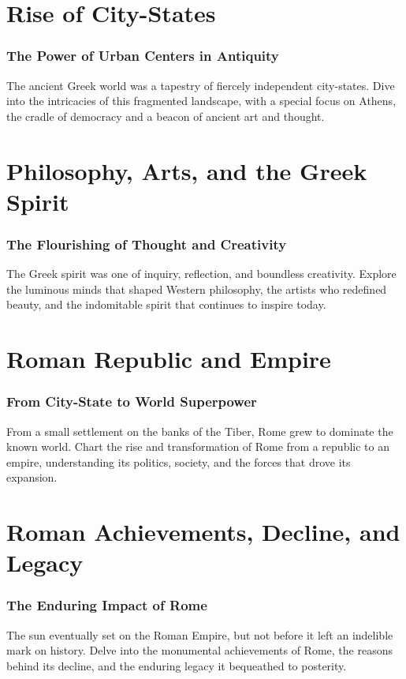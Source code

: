 \documentclass[a4paper,12pt]{book}
\begin{document}
\chapter{Rise of City-States}
\subsection*{The Power of Urban Centers in Antiquity}
The ancient Greek world was a tapestry of fiercely independent city-states. Dive into the intricacies of this fragmented landscape, with a special focus on Athens, the cradle of democracy and a beacon of ancient art and thought.

\chapter{Philosophy, Arts, and the Greek Spirit}
\subsection*{The Flourishing of Thought and Creativity}
The Greek spirit was one of inquiry, reflection, and boundless creativity. Explore the luminous minds that shaped Western philosophy, the artists who redefined beauty, and the indomitable spirit that continues to inspire today.

\chapter{Roman Republic and Empire}
\subsection*{From City-State to World Superpower}
From a small settlement on the banks of the Tiber, Rome grew to dominate the known world. Chart the rise and transformation of Rome from a republic to an empire, understanding its politics, society, and the forces that drove its expansion.

\chapter{Roman Achievements, Decline, and Legacy}
\subsection*{The Enduring Impact of Rome}
The sun eventually set on the Roman Empire, but not before it left an indelible mark on history. Delve into the monumental achievements of Rome, the reasons behind its decline, and the enduring legacy it bequeathed to posterity.
\end{document}
